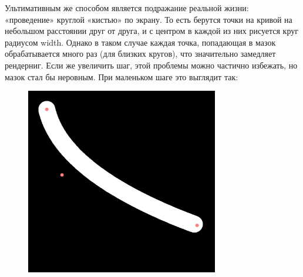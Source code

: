 \documentclass[11pt]{article}
\begin{document}
    Ультимативным же способом является подражание реальной жизни: «проведение» круглой «кистью» по экрану.
    То есть берутся точки на кривой на небольшом расстоянии друг от друга, и с центром в каждой из них рисуется круг радиусом width.
    Однако в таком случае каждая точка, попадающая в мазок обрабатывается много раз (для близких кругов), что значительно замедляет рендерниг.
    Если же увеличить шаг, этой проблемы можно частично избежать, но мазок стал бы неровным.
    При маленьком шаге это выглядит так:
    \begin{figure}[h!]
        \centering
        \includegraphics[width=0.75\textwidth]{stroke_smooth.png}
        \label{fig:smooth_stroke}
    \end{figure}
\end{document}
